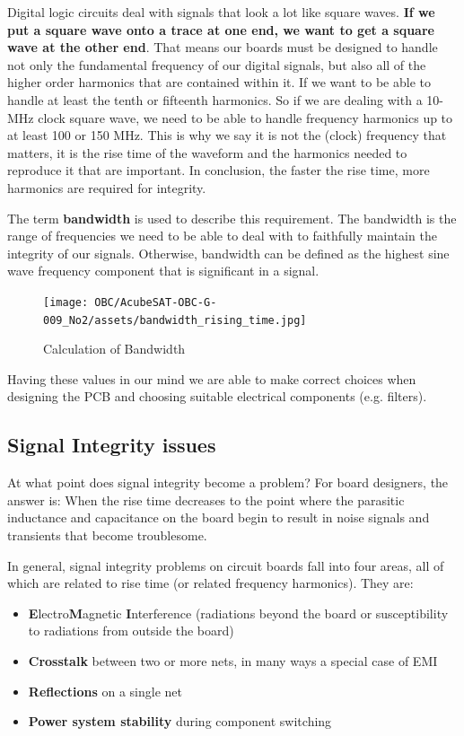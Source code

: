 \documentclass[final]{cubedoc}
\begin{document}
	Digital logic circuits deal with signals that look a lot like square waves. \textbf{If we put a square wave onto a trace at one end, we want to get a square wave at the other end}. That means our boards must be designed to handle not only the fundamental frequency of our digital signals, but also all of the higher order harmonics that are contained within it. If we want to be able to handle at least the tenth or fifteenth harmonics. So if we are dealing with a 10-MHz clock square wave, we need to be able to handle frequency harmonics up to at least 100 or 150 MHz. This is why we say it is not the (clock) frequency that matters, it is the rise time of the waveform and the harmonics needed to reproduce it that are important. In conclusion, the faster the rise time, more harmonics are required for integrity. 
	
	The term \textbf{bandwidth} is used to describe this requirement. The bandwidth is the range of frequencies we need to be able to deal with to faithfully maintain the integrity of our signals. Otherwise, bandwidth can be defined as the highest sine wave frequency component that is significant in a signal.
	
	\begin{figure}[h!]
		\centering
		\texttt{[image: OBC/AcubeSAT-OBC-G-009\_No2/assets/bandwidth\_rising\_time.jpg]}
		\caption{Calculation of Bandwidth}
		\label{fig:my_label}
	\end{figure}
	
	Having these values in our mind we are able to make correct choices when designing the PCB and choosing suitable electrical components (e.g. filters).
	
	\subsection{Signal Integrity issues}
	
	At what point does signal integrity become a problem? For board designers, the answer is: When the rise time decreases to the point where the parasitic inductance and capacitance on the board begin to result in noise signals and transients that become troublesome. 
	
	In general, signal integrity problems on circuit boards fall into four areas, all of which are related to rise time (or related frequency harmonics). They are:
	
	\begin{itemize}
		\item \textbf{E}lectro\textbf{M}agnetic \textbf{I}nterference (radiations beyond the board or susceptibility to radiations from outside the board)
		\item \textbf{Crosstalk} between two or more nets, in
		many ways a special case of EMI
		\item \textbf{Reflections} on a single net
		\item \textbf{Power system stability} during component switching
	\end{itemize}
	
\end{document}
